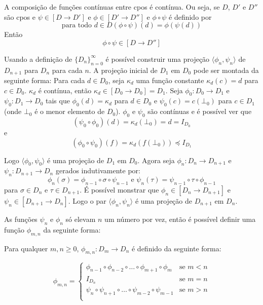 \documentclass[../main.tex]{subfiles}
\begin{document}
\begin{lemma}
    A composição de funções contínuas entre cpos é contínua. Ou seja, se $D$, $D'$ e $D''$ são cpos e $\psi \in [D \to D']$ e $\phi \in [D' \to D'']$ e $\phi \circ \psi$ é definido por $$\text{para todo } d \in D (\phi \circ \psi)(d) = \phi (\psi (d))$$
    Então $$\phi \circ \psi \in [D \to D'']$$
\end{lemma}

Usando a definição de $\{D_n\}^{\infty}_{n=0}$ é possível construir uma projeção $\langle \phi_n, \psi_n \rangle$ de $D_{n+1}$ para $D_n$ para cada $n$. A projeção inicial de $D_1$ em $D_0$ pode ser montada da seguinte forma: Para cada $d \in D_0$, seja $\kappa_d$ uma função constante $\kappa_d (c) = d$ para $c \in D_0$. $\kappa_d$ é contínua, então $\kappa_d \in [D_0 \to D_0] = D_1$. Seja $\phi_0 : D_0 \to D_1$ e $\psi_0 : D_1 \to D_0$ tais que $\phi_0(d) = \kappa_d$ para $d \in D_0$ e $\psi_0 (c) = c(\bot_0)$ para $c \in D_1$ (onde $\bot_0$ é o menor elemento de $D_0$). $\phi_0$ e $\psi_0$ são contínuas e é possível ver que $$(\psi_0 \circ \phi_0) (d) = \kappa_d (\bot_0) = d = I_{D_0}$$ e $$(\phi_0 \circ \psi_0 )(f) = \kappa_d (f (\bot_0)) \preceq I_{D_1}$$

Logo $\langle \phi_0, \psi_0 \rangle$ é uma projeção de $D_1$ em $D_0$. Agora seja $\phi_n : D_n \to D_{n+1}$ e $\psi_n : D_{n+1} \to D_n$ gerados indutivamente por: $$\phi_n(\sigma) = \phi_{n-1} \circ \sigma \circ \psi_{n-1} \text{  e  } \psi_n(\tau) = \psi_{n-1} \circ \tau \circ \phi_{n-1}$$ para $\sigma \in D_n$ e $\tau \in D_{n+1}$. É possível monstrar que $\phi_n \in [D_n \to D_{n+1}]$ e $\psi_n \in [D_{n+1} \to D_n]$. Logo o par $\langle \phi_n, \psi_n \rangle$ é uma projeção de $D_{n+1}$ em $D_n$.

As funções $\psi_n$ e $\phi_n$ só elevam $n$ um número por vez, então é possível definir uma função $\phi_{m,n}$ da seguinte forma:

\begin{definition}
    Para qualquer $m, n \geq 0$, $\phi_{m,n} : D_m \to D_n$ é definido da seguinte forma:

    \begin{equation*}
        \phi_{m,n} =
        \begin{cases}
            \phi_{n - 1} \circ \phi_{n - 2} \circ \dots \circ \phi_{m + 1} \circ \phi_{m} & \text{se } m < n \\
            I_{D_n} & \text{se } m = n \\
            \psi_n \circ \psi_{n+1} \circ \dots \circ \psi_{m - 2} \circ \psi_{m - 1} & \text{se } m > n \\
        \end{cases}
    \end{equation*}
\end{definition}
\end{document}
